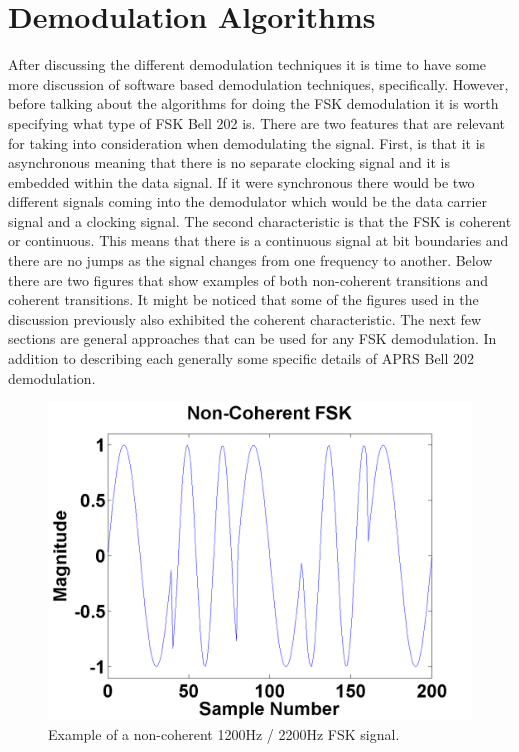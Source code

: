 \chapter{Demodulation Algorithms}
After discussing the different demodulation techniques it is time to have some more discussion of software based demodulation techniques, specifically. However, before talking about the algorithms for doing the FSK demodulation it is worth specifying what type of FSK Bell 202 is. There are two features that are relevant for taking into consideration when demodulating the signal. First, is that it is asynchronous meaning that there is no separate clocking signal and it is embedded within the data signal. If it were synchronous there would be two different signals coming into the demodulator which would be the data carrier signal and a clocking signal. The second characteristic is that the FSK is coherent or continuous. This means that there is a continuous signal at bit boundaries and there are no jumps as the signal changes from one frequency to another. Below there are two figures that show examples of both non-coherent transitions and coherent transitions. It might be noticed that some of the figures used in the discussion previously also exhibited the coherent characteristic. The next few sections are general approaches that can be used for any FSK demodulation. In addition to describing each generally some specific details of APRS Bell 202 demodulation. 
\begin{figure}
  \centering
	\includegraphics[width=0.75\linewidth]{images/NonCoherentFSK.png} 
	\caption{Example of a non-coherent 1200Hz / 2200Hz FSK signal.}
\end{figure}
